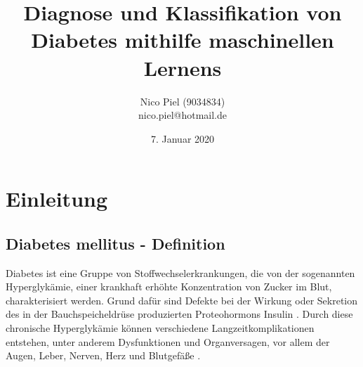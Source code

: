 \documentclass{article}
\title{Diagnose und Klassifikation von Diabetes mithilfe maschinellen Lernens}
\author{Nico Piel (9034834) \\ nico.piel@hotmail.de}
\date{7. Januar 2020}
\begin{document}
\maketitle

\newpage

\tableofcontents

\newpage

\section{Einleitung}

\subsection{Diabetes mellitus - Definition}
Diabetes ist eine Gruppe von Stoffwechselerkrankungen, die von der sogenannten Hyperglykämie, einer krankhaft erhöhte Konzentration von Zucker im Blut, charakterisiert werden. Grund dafür sind Defekte bei der Wirkung oder Sekretion des in der Bauchspeicheldrüse produzierten Proteohormons Insulin \cite{ada}. Durch diese chronische Hyperglykämie können verschiedene Langzeitkomplikationen entstehen, unter anderem Dysfunktionen und Organversagen, vor allem der Augen, Leber, Nerven, Herz und Blutgefäße \cite{who}.

\newpage

\printbibliography
\end{document}
